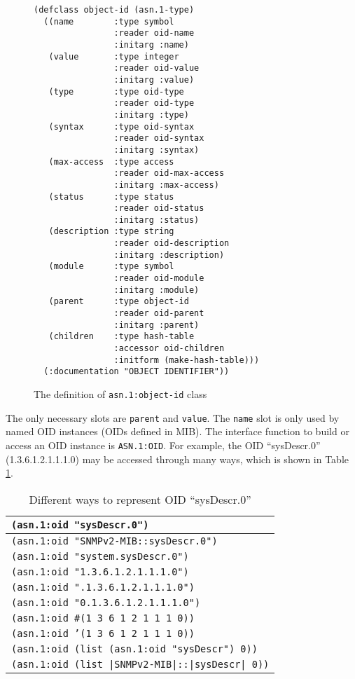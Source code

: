 \documentclass[reprint,natbib,9pt]{sigplanconf}
\begin{document}
\begin{figure}
\begin{verbatim}
(defclass object-id (asn.1-type)
  ((name        :type symbol
                :reader oid-name
                :initarg :name)
   (value       :type integer
                :reader oid-value
                :initarg :value)
   (type        :type oid-type
                :reader oid-type
                :initarg :type)
   (syntax      :type oid-syntax
                :reader oid-syntax
                :initarg :syntax)
   (max-access  :type access
                :reader oid-max-access
                :initarg :max-access)
   (status      :type status
                :reader oid-status
                :initarg :status)
   (description :type string
                :reader oid-description
                :initarg :description)
   (module      :type symbol
                :reader oid-module
                :initarg :module)
   (parent      :type object-id
                :reader oid-parent
                :initarg :parent)
   (children    :type hash-table
                :accessor oid-children
                :initform (make-hash-table)))
  (:documentation "OBJECT IDENTIFIER"))
\end{verbatim}
  \caption{The definition of \texttt{asn.1:object-id} class}
  \label{defclass:object-id}
\end{figure}

The only necessary slots are \texttt{parent} and \texttt{value}.
The \texttt{name} slot is only used by named OID instances (OIDs defined in MIB).
The interface function to build or access an OID instance is
\texttt{ASN.1:OID}.  For example, the OID ``sysDescr.0''
(1.3.6.1.2.1.1.1.0) may be accessed through many ways, which is shown
in Table \ref{table:oid}.

\begin{table}
  \centering
  \caption{Different ways to represent OID ``sysDescr.0''}
  \label{table:oid}
  \begin{tabular}{|l|}
    \hline
    \texttt{(asn.1:oid "sysDescr.0")}\\\hline
	\texttt{(asn.1:oid "SNMPv2-MIB::sysDescr.0")}\\\hline
    \texttt{(asn.1:oid "system.sysDescr.0")}\\\hline
    \texttt{(asn.1:oid "1.3.6.1.2.1.1.1.0")}\\\hline
    \texttt{(asn.1:oid ".1.3.6.1.2.1.1.1.0")}\\\hline
    \texttt{(asn.1:oid "0.1.3.6.1.2.1.1.1.0")}\\\hline
    \texttt{(asn.1:oid \#(1 3 6 1 2 1 1 1 0))}\\\hline
    \texttt{(asn.1:oid '(1 3 6 1 2 1 1 1 0))}\\\hline
    \texttt{(asn.1:oid (list (asn.1:oid "sysDescr") 0))}\\\hline
    \texttt{(asn.1:oid (list |SNMPv2-MIB|::|sysDescr| 0))}\\
    \hline
  \end{tabular}
\end{table}
\end{document}
